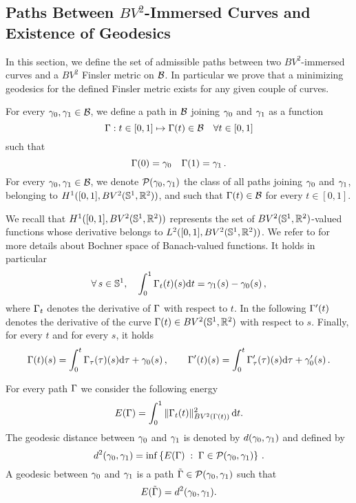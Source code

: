 \subsection{Paths Between $BV^2$-Immersed Curves and Existence of Geodesics}
\label{existence_geod}

In this section, we define the set of admissible paths between two $BV^2$-immersed curves and  a $BV^2$ Finsler metric on $\mathcal{B}$. In particular we prove that a minimizing geodesics for the defined Finsler metric exists for any given couple of curves.


\begin{defn}[{\bf paths in $\Ba$}]
For every $\gamma_0,\gamma_1\in \mathcal{B}$, we define a path in $\Ba$ joining  $\gamma_0$ and $\gamma_1$ as a function 
$$
	\Gamma: t\in [0,1] \mapsto \Gamma(t) \in \mathcal{B} \quad \forall t\in [0,1]
$$
such that
\begin{equation}\label{initial_conditions} 
 	\Gamma(0) = \gamma_0\quad \Gamma(1) = \gamma_1\,.
\end{equation}
For every $\gamma_0,\gamma_1\in \mathcal{B}$, we denote $\mathcal{P}(\gamma_0,\gamma_1)$ the class of all paths joining $\gamma_0$ and $\gamma_1$, belonging to $H^1([0,1],BV^2(\mathbb{S}^1,\mathbb{R}^2))$, and such that $\Gamma(t)\in\mathcal{B}$ for every $t\in [0,1]$. 

We recall that $H^1([0,1],BV^2(\mathbb{S}^1,\mathbb{R}^2))$ represents the set of $BV^2(\mathbb{S}^1,\mathbb{R}^2)$-valued functions whose derivative belongs to $L^2([0,1],BV^2(\mathbb{S}^1,\mathbb{R}^2))$. We refer to \cite{Iounesco} for more details about Bochner space of Banach-valued functions. It holds in particular  
\begin{equation}\label{flow}
	\forall \, s\in \mathbb{S}^1, \quad
	\int_0^1 \Gamma_t(t)(s) \mathrm{d} t = \gamma_1(s)-\gamma_0(s)\,,
\end{equation}
where $\Gamma_t$ denotes the derivative of $\Gamma$ with respect to $t$. In the following $\Gamma'(t)$ denotes the derivative of the curve $\Gamma(t)\in BV^2(\mathbb{S}^1,\mathbb{R}^2)$ with respect to $s$. Finally, for every $t$ and for every $s$, it holds
\begin{equation}\label{t-curve-der}
\Gamma(t)(s) = \int_0^t \Gamma_\tau(\tau)(s) \mathrm{d} \tau +\gamma_0(s)
\,,\quad \quad
\Gamma'(t)(s) = \int_0^t \Gamma_\tau'(\tau)(s) \mathrm{d} \tau +\gamma_0'(s)\,.
\end{equation}
\end{defn}

\begin{defn}\label{defn-geodesic-paths}
 For every path $\Gamma$ we consider the following energy 
\begin{equation}\label{energy-bv2}
	E(\Gamma)=\int_0^1 \|\Gamma_t(t)\|_{BV^2(\Gamma(t))}^2\,\mathrm{d} t.
\end{equation}
The geodesic distance between $\gamma_0$ and $ \gamma_1$ is denoted by $d(\gamma_0,\gamma_1)$ and defined by 
\begin{equation}\label{problem}
	d^2(\gamma_0,\gamma_1) = {\rm inf}\left\{  E(\Gamma)  \;:\;  
		\Gamma\in \mathcal{P}(\gamma_0,\gamma_1) 
	 \right\}\,.
\end{equation}
A geodesic between $\gamma_0$ and $\gamma_1$ is a path $\tilde{\Gamma}\in \mathcal{P}(\gamma_0,\gamma_1)$ such that
$$	
	E(\tilde{\Gamma}) = d^2(\gamma_0,\gamma_1).
$$
\end{defn}

